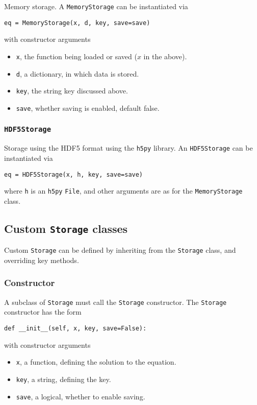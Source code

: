 \documentclass[11pt]{article}
\begin{document}
Memory storage. A \texttt{MemoryStorage} can be instantiated via
\begin{lstlisting}
eq = MemoryStorage(x, d, key, save=save)
\end{lstlisting}
with constructor arguments
\begin{itemize}
  \item \texttt{x}, the function being loaded or saved ($x$ in the above).
  \item \texttt{d}, a dictionary, in which data is stored.
  \item \texttt{key}, the string key discussed above.
  \item \texttt{save}, whether saving is enabled, default false.
\end{itemize}

\subsubsection{\texttt{HDF5Storage}}

Storage using the HDF5 format \citep{hdf52021} using the \texttt{h5py} library.
An \texttt{HDF5Storage} can be instantiated via
\begin{lstlisting}
eq = HDF5Storage(x, h, key, save=save)
\end{lstlisting}
where \texttt{h} is an \texttt{h5py} \texttt{File}, and other arguments are as
for the \texttt{MemoryStorage} class.

\subsection{Custom \texttt{Storage} classes}

Custom \texttt{Storage} can be defined by inheriting from the \texttt{Storage}
class, and overriding key methods.

\subsubsection{Constructor}

A subclass of \texttt{Storage} must call the \texttt{Storage} constructor. The
\texttt{Storage} constructor has the form
\begin{lstlisting}
def __init__(self, x, key, save=False):
\end{lstlisting}
with constructor arguments
\begin{itemize}
  \item \texttt{x}, a function, defining the solution to the equation.
  \item \texttt{key}, a string, defining the key.
  \item \texttt{save}, a logical, whether to enable saving.
\end{itemize}
\end{document}
